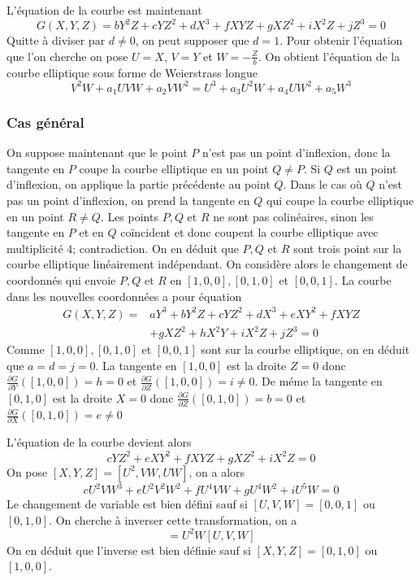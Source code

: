 \documentclass{article}
\begin{document}
L'équation de la courbe est maintenant
\begin{equation*}
G(X,Y,Z) = bY^2Z + cYZ^2 + dX^3 + fXYZ + gXZ^2 + iX^2Z + jZ^3 = 0
\end{equation*}
Quitte à diviser par $d\neq 0$, on peut supposer que $d=1$. Pour obtenir l'équation que l'on cherche on pose
$U=X$, $V=Y$ et $W=-\frac{Z}{b}$. On obtient l'équation de la courbe elliptique sous forme de Weierstrass longue
\begin{equation*}
V^2W + a_{1}UVW + a_{2}VW^2 = U^3 + a_{3}U^2W + a_{4}UW^2 + a_{5}W^3
\end{equation*}

\subsubsection{Cas général}
On suppose maintenant que le point $P$ n'est pas un point d'inflexion, donc la tangente en $P$ coupe la courbe
elliptique en un point $Q\neq P$. Si $Q$ est un point d'inflexion, on applique la partie précédente au point $Q$.
Dans le cas où $Q$ n'est pas un point d'inflexion, on prend la tangente en $Q$ qui coupe la courbe elliptique 
en un point $R\neq Q$. Les points $P, Q$ et $R$ ne sont pas colinéaires, sinon les tangente en $P$ et en $Q$ coïncident
et donc coupent la courbe elliptique avec multiplicité $4$; contradiction. On en déduit que $P, Q$ et $R$ sont trois
point sur la courbe elliptique linéairement indépendant. On considère alors le changement de coordonnés qui envoie
$P, Q$ et $R$ en $[1,0,0], [0,1,0]$ et $[0,0,1]$. La courbe dans les nouvelles coordonnées a pour équation
\begin{align*}
G(X,Y,Z) = &aY^3 + bY^2Z + cYZ^2 + dX^3 + eXY^2 + fXYZ \\
			& + gXZ^2 + hX^2Y + iX^2Z + jZ^3 = 0
\end{align*}
Comme $[1,0,0], [0,1,0]$ et $[0,0,1]$ sont sur la courbe elliptique, on en déduit que $a=d=j=0$. La tangente en
$[1,0,0]$ est la droite $Z=0$ donc $\frac{\partial G}{\partial Y}([1,0,0])=h=0$ et 
$\frac{\partial G}{\partial Z}([1,0,0])=i\neq 0$. De méme la tangente en $[0,1,0]$ est la droite $X=0$ donc
$\frac{\partial G}{\partial Z}([0,1,0])=b=0$ et $\frac{\partial G}{\partial X}([0,1,0])=e\neq 0$

L'équation de la courbe devient alors
\begin{equation*}
cYZ^2 + eXY^2 + fXYZ + gXZ^2 + iX^2Z = 0
\end{equation*}
On pose $[X, Y, Z]=[U^2, VW, UW]$, on a alors
\begin{equation*}
cU^2VW^3 + eU^2V^2W^2 + fU^4VW + gU^4W^2 + iU^5W = 0
\end{equation*}
Le changement de variable est bien défini sauf si $[U, V, W]=[0, 0, 1]$ ou $[0, 1, 0]$.
On cherche à inverser cette transformation, on a
\begin{equation*}
[XZ, XY, Z^2]=U^2W[U, V, W]
\end{equation*}
On en déduit que l'inverse est bien définie sauf si $[X, Y, Z]=[0, 1, 0]$ ou $[1, 0, 0]$.
\end{document}
